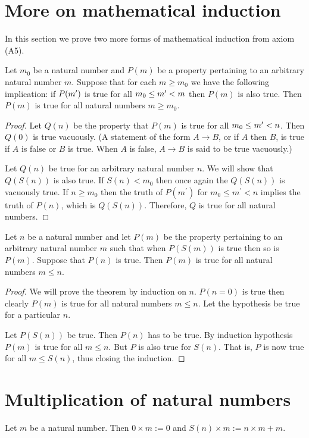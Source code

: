 \section{More on mathematical induction}\label{c1s4}
In this section we prove two more forms of mathematical induction from 
axiom (A5).

\begin{thm}\label{c1s4t1}
Let $m_0$ be a natural number and $P(m)$ be a property pertaining to an
arbitrary natural number $m$. Suppose that for each $m \ge m_0$ we have 
the following implication: if $P(m^\prime)$ is true for all $m_0 \le m^\prime
< m$ then $P(m)$ is also true. Then $P(m)$ is true for all natural numbers
$m \ge m_0$.
\end{thm}
\begin{proof}
Let $Q(n)$ be the property that $P(m)$ is true for all $m_0 \le m^\prime < n$.
Then $Q(0)$ is true vacuously. (A statement of the form $A \rightarrow B$, 
or if $A$ then $B$, is true if $A$ is false or $B$ is true. When $A$ is
false, $A \rightarrow B$ is said to be true vacuously.)

Let $Q(n)$ be true for an arbitrary natural number $n$. We will show that
$Q(S(n))$ is also true. If $S(n) < m_0$ then once again the $Q(S(n))$ is
vacuously true. If $n \ge m_0$ then the truth of $P(m^\prime)$ for $m_0
\le m^\prime < n$ implies the truth of $P(n)$, which is $Q(S(n))$. 
Therefore, $Q$ is true for all natural numbers.
\end{proof}

\begin{thm}\label{c1s4t2}
Let $n$ be a natural number and let $P(m)$ be the property pertaining to
an arbitrary natural number $m$ such that when $P(S(m))$ is true then so is
$P(m)$. Suppose that $P(n)$ is true. Then $P(m)$ is true for all natural
numbers $m \le n$.
\end{thm}
\begin{proof}
We will prove the theorem by induction on $n$. $P(n=0)$ is true then clearly
$P(m)$ is true for all natural numbers $m \le n$. Let the hypothesis be true
for a particular $n$. 

Let $P(S(n))$ be true. Then $P(n)$ has to be true. By induction hypothesis
$P(m)$ is true for all $m \le n$. But $P$ is also true for $S(n)$. That is,
$P$ is now true for all $m \le S(n)$, thus closing the induction.
\end{proof}

\section{Multiplication of natural numbers}\label{c1s5}
\begin{defn}\label{c1s5d1}
Let $m$ be a natural number. Then $0 \times m := 0$ and $S(n) \times m :=
n \times m + m$.
\end{defn}


